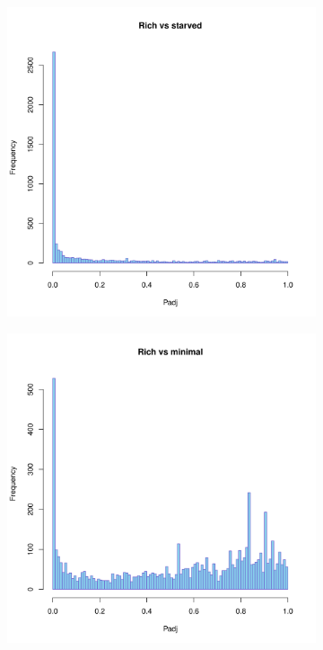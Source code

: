 \begin{figure}[H]
\begin{subfigure}{0.5\textwidth}
\includegraphics[width=0.9\linewidth]{psa/hist_rich_starved.png} 
\end{subfigure}
\begin{subfigure}{0.5\textwidth}
\includegraphics[width=0.9\linewidth]{psa/hist_rich_minimal.png}
\end{subfigure}

\end{figure}
